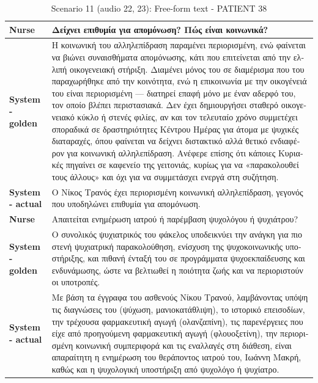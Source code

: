 \begin{table}[H]
\centering
\renewcommand{\arraystretch}{1.5} 
\begin{tabular}{|>{\bfseries}l|p{11cm}|}
\hline
Nurse & \textgreek{Δείχνει επιθυμία για απομόνωση? Πώς είναι κοινωνικά?} \\
\hline
System - golden & \textgreek{Η κοινωνική του αλληλεπίδραση παραμένει περιορισμένη, ενώ φαίνεται να βιώνει συναισθήματα απομόνωσης, κάτι που επιτείνεται από την ελλιπή οικογενειακή στήριξη. Διαμένει μόνος του σε διαμέρισμα που του παραχωρήθηκε από την κοινότητα, ενώ η επικοινωνία με την οικογένειά του είναι περιορισμένη — διατηρεί επαφή μόνο με έναν αδερφό του, τον οποίο βλέπει περιστασιακά. Δεν έχει δημιουργήσει σταθερό οικογενειακό κύκλο ή στενές φιλίες, αν και τον τελευταίο χρόνο συμμετέχει σποραδικά σε δραστηριότητες Κέντρου Ημέρας για άτομα με ψυχικές διαταραχές, όπου φαίνεται να δείχνει διστακτικό αλλά θετικό ενδιαφέρον για κοινωνική αλληλεπίδραση. Ανέφερε επίσης ότι κάποιες Κυριακές πηγαίνει σε καφενείο της γειτονιάς, κυρίως για να «παρακολουθεί τους άλλους» και όχι για να συμμετάσχει ενεργά στη συζήτηση.} \\
\hline
System - actual & \textgreek{Ο Νίκος Τρανός έχει περιορισμένη κοινωνική αλληλεπίδραση, γεγονός που υποδηλώνει επιθυμία για απομόνωση.} \\
\hline
Nurse & \textgreek{Απαιτείται ενημέρωση ιατρού ή παρέμβαση ψυχολόγου ή ψυχιάτρου?} \\
\hline
System - golden & \textgreek{Ο συνολικός ψυχιατρικός του φάκελος υποδεικνύει την ανάγκη για πιο στενή ψυχιατρική παρακολούθηση, ενίσχυση της ψυχοκοινωνικής υποστήριξης, και πιθανή ένταξή του σε προγράμματα ψυχοεκπαίδευσης και ενδυνάμωσης, ώστε να βελτιωθεί η ποιότητα ζωής και να περιοριστούν οι υποτροπές.} \\
\hline
System - actual & \textgreek{Με βάση τα έγγραφα του ασθενούς Νίκου Τρανού, λαμβάνοντας υπόψη τις διαγνώσεις του (ψύχωση, μανιοκατάθλιψη), το ιστορικό επεισοδίων, την τρέχουσα φαρμακευτική αγωγή (ολανζαπίνη), τις παρενέργειες που είχε από προηγούμενη φαρμακευτική αγωγή (φλουοξετίνη), την περιορισμένη κοινωνική συμπεριφορά και τις εναλλαγές στη διάθεση, είναι απαραίτητη η ενημέρωση του θεράποντος ιατρού του, Ιωάννη Μακρή, καθώς και η ψυχολογική υποστήριξη από ψυχολόγο ή ψυχίατρο.} \\
\hline
\end{tabular}
\caption{Scenario 11 (audio 22, 23): Free-form text - PATIENT 38}
\end{table}

